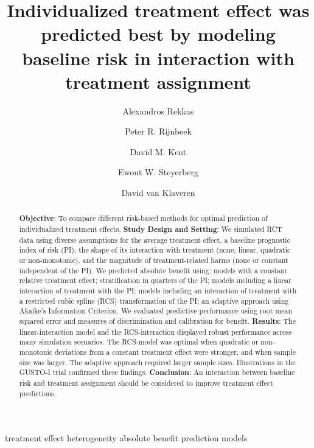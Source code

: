 \documentclass[]{elsarticle} %
\date{}
\begin{document}
\begin{frontmatter}

  \title{Individualized treatment effect was predicted best by modeling
baseline risk in interaction with treatment assignment}
    \author[1]{Alexandros Rekkas}
  
    \author[1]{Peter R. Rijnbeek}
  
    \author[2]{David M. Kent}
  
    \author[3]{Ewout W. Steyerberg}
  
    \author[4]{David van Klaveren}
  
      \address[1]{Department of Medical Informatics, Erasmus Medical
Center, Rotterdam, The Netherlands}
    \address[2]{Predictive Analytics and Comparative Effectiveness
Center, Institute for Clinical Research and Health Policy Studies, Tufts
Medical Center, Boston, Massachusetts, USA}
    \address[3]{Department of Biomedical Data Sciences, Leiden
University Medical Center, Leiden, The Netherlands}
    \address[4]{Department of Public Health, Erasmus Medical Center,
Rotterdam, The Netherlands}
    
  \begin{abstract}
  \textbf{Objective}: To compare different risk-based methods for
  optimal prediction of individualized treatment effects. \textbf{Study
  Design and Setting}: We simulated RCT data using diverse assumptions
  for the average treatment effect, a baseline prognostic index of risk
  (PI), the shape of its interaction with treatment (none, linear,
  quadratic or non-monotonic), and the magnitude of treatment-related
  harms (none or constant independent of the PI). We predicted absolute
  benefit using: models with a constant relative treatment effect;
  stratification in quarters of the PI; models including a linear
  interaction of treatment with the PI; models including an interaction
  of treatment with a restricted cubic spline (RCS) transformation of
  the PI; an adaptive approach using Akaike's Information Criterion. We
  evaluated predictive performance using root mean squared error and
  measures of discrimination and calibration for benefit.
  \textbf{Results}: The linear-interaction model and the RCS-interaction
  displayed robust performance across many simulation scenarios. The
  RCS-model was optimal when quadratic or non-monotonic deviations from
  a constant treatment effect were stronger, and when sample size was
  larger. The adaptive approach required larger sample sizes.
  Illustrations in the GUSTO-I trial confirmed these findings.
  \textbf{Conclusion}: An interaction between baseline risk and
  treatment assignment should be considered to improve treatment effect
  predictions.
  \end{abstract}
   \begin{keyword} treatment effect heterogeneity absolute
benefit prediction models\end{keyword}
 \end{frontmatter}
\end{document}
